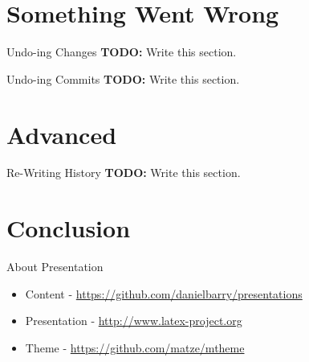 \documentclass{beamer}
\begin{document}
  \section{Something Went Wrong}
  \begin{frame}{Undo-ing Changes}
    \textbf{TODO:} Write this section.
  \end{frame}
  \begin{frame}{Undo-ing Commits}
    \textbf{TODO:} Write this section.
  \end{frame}
  \section{Advanced}
  \begin{frame}{Re-Writing History}
    \textbf{TODO:} Write this section.
  \end{frame}
  \section{Conclusion}
  \begin{frame}{About Presentation}
    \begin{itemize}
      \item Content - \url{https://github.com/danielbarry/presentations}
      \item Presentation - \url{http://www.latex-project.org}
      \item Theme - \url{https://github.com/matze/mtheme}
    \end{itemize}
  \end{frame}
\end{document}
